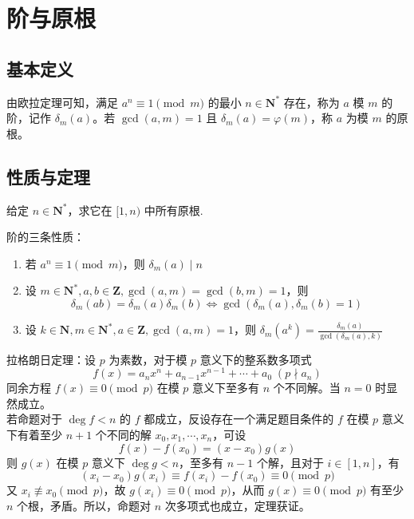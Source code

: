 \documentclass[12pt,a4paper]{article}
\begin{document}
\newpage
\section{阶与原根}
\subsection{基本定义}
由欧拉定理可知，满足 $a^n\equiv1\pmod m$ 的最小 $n\in\mathbf{N^*}$ 存在，称为 $a$ 模 $m$ 的阶，记作 $\delta_m(a)$。若 $\gcd(a,m)=1$ 且 $\delta_m(a)=\varphi(m)$，称 $a$ 为模 $m$ 的原根。
\subsection{性质与定理}
\begin{mdframed}[leftline=true, linewidth=2pt, linecolor=gray]
	给定 $n\in\mathbf{N^*}$，求它在 $[1,n)$ 中所有原根.
\end{mdframed}
阶的三条性质：
\begin{enumerate}
	\item 若 $a^n\equiv 1\pmod m$，则 $\delta_m{(a)}\mid n$
	\item 设 $m\in \mathbf{N}^*,a,b\in\mathbf{Z},\gcd(a,m)=\gcd(b,m)=1$，则 \begin{equation*}
		\delta_m(ab)=\delta_m(a)\delta_m(b)\iff \gcd(\delta_m(a),\delta_m(b)=1)
	\end{equation*}
	\item 设 $k\in\mathbf{N},m\in\mathbf{N^*},a\in\mathbf{Z}, \gcd(a,m)=1$，则 $\displaystyle\delta_m(a^k)=\frac{\delta_m(a)}{\gcd(\delta_m(a),k)}$
\end{enumerate}
拉格朗日定理：设 $p$ 为素数，对于模 $p$ 意义下的整系数多项式 
\begin{equation*}
	f(x)=a_nx^n+a_{n-1}x^{n-1}+\cdots+a_0\;(p\nmid a_n)
\end{equation*}
同余方程 $f(x)\equiv 0\pmod p$ 在模 $p$ 意义下至多有 $n$ 个不同解。当 $n=0$ 时显然成立。\\若命题对于 $\deg f< n$ 的 $f$ 都成立，反设存在一个满足题目条件的 $f$ 在模 $p$ 意义下有着至少 $n+1$ 个不同的解 $x_0,x_1,\cdots,x_{n}$，可设
\begin{equation*}
	f(x)-f(x_0)=(x-x_0)g(x)
\end{equation*}
则 $g(x)$ 在模 $p$ 意义下 $\deg g<n$，至多有 $n-1$ 个解，且对于 $i\in[1,n]$，有 
\begin{equation*}
	(x_i-x_0)g(x_i)\equiv f(x_i)-f(x_0)\equiv0\pmod p
\end{equation*}
又 $x_i\not\equiv x_0\pmod p$，故 $g(x_i)\equiv0\pmod p$，从而 $g(x)\equiv0\pmod p$ 有至少 $n$ 个根，矛盾。所以，命题对 $n$ 次多项式也成立，定理获证。\\\\
\end{document}
